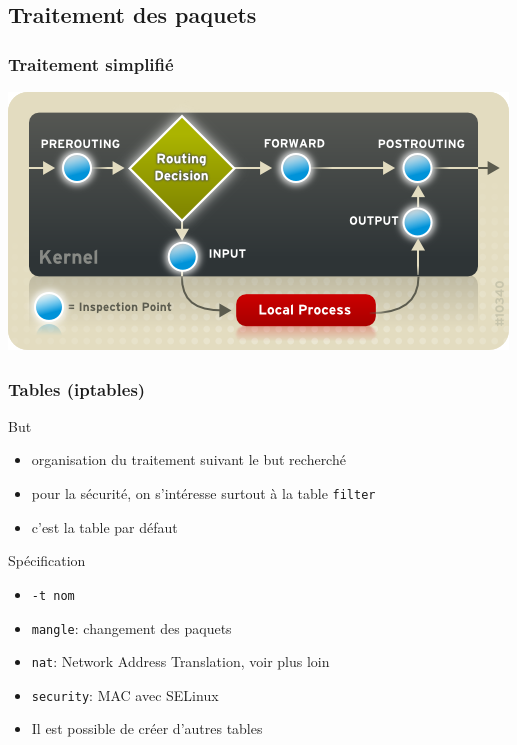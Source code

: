 \begin{reveals}
\section{Traitement des paquets}

\begin{frame}
  \frametitle{Traitement simplifié}

  \vfill
  \begin{center}
    \includegraphics[width=0.8\linewidth]{iptables_small}
  \end{center}
  \vfill
\end{frame}


\begin{frame}
  \frametitle{Tables (iptables)}

  \vfill

  \begin{block}{But}
    \begin{itemize}
    \item organisation du traitement suivant le but recherché
    \item pour la sécurité, on s'intéresse surtout à la table
      \texttt{filter}
    \item c'est la table par défaut
    \end{itemize}
  \end{block}
  \vfill
  \begin{block}{Spécification}
    \begin{itemize}
  \item \texttt{-t nom}
  \item \texttt{mangle}: changement des paquets
  \item \texttt{nat}: Network Address Translation, voir plus loin
  \item \texttt{security}: MAC avec SELinux
  \item Il est possible de créer d'autres tables
    \end{itemize}
  \end{block}
  \vfill
\end{frame}


\end{reveals}

